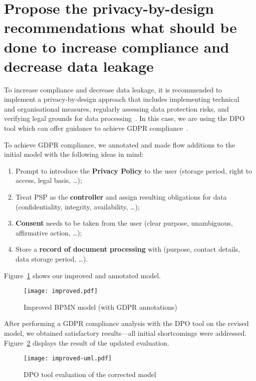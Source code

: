 \section{Propose the privacy-by-design recommendations what should be done to
increase compliance and decrease data leakage}

To increase compliance and decrease data leakage, it is recommended to implement
a privacy-by-design approach that includes implementing technical and
organisational measures, regularly assessing data protection risks, and
verifying legal grounds for data
processing~\cite[110-111]{10.1007/978-3-030-58135-0_9}. In this case, we are
using the DPO tool which can offer guidance to achieve GDPR
compliance~\cite{dpotool}.

To achieve GDPR compliance, we annotated and made flow additions to the initial
model with the following ideas in mind:
\begin{enumerate}
  \item Prompt to introduce the \textbf{Privacy Policy} to the user (storage
  period, right to access, legal basis, \dots);
  \item Treat PSP as the \textbf{controller} and assign resulting obligations
  for data (confidentiality, integrity, availability, \dots);
  \item \textbf{Consent} needs to be taken from the user (clear purpose,
  unambiguous, affirmative action, \dots);
  \item Store a \textbf{record of document processing} with (purpose, contact
  details, data storage period, \dots).
\end{enumerate}

Figure~\ref{fig:improved-model} shows our improved and annotated model.

\begin{landscape}

\begin{figure}[ht]
\begin{center}
  \texttt{[image: improved.pdf]}
  \caption{Improved BPMN model (with GDPR annotations)}
  \label{fig:improved-model}
\end{center}
\end{figure}

\end{landscape}

After performing a GDPR compliance analysis with the DPO tool on the revised
model, we obtained satisfactory results---all initial shortcomings were
addressed. Figure~\ref{fig:improved-uml} displays the result of the updated
evaluation.

\begin{figure}[!hb]
\begin{center}
  \texttt{[image: improved-uml.pdf]}
  \caption{DPO tool evaluation of the corrected model}
  \label{fig:improved-uml}
\end{center}
\end{figure}
